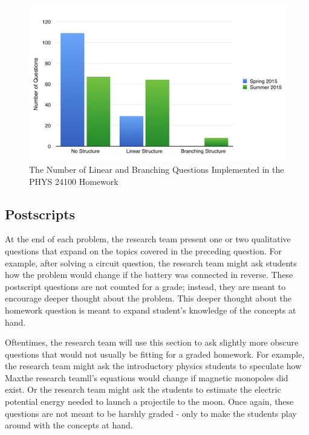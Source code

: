 \begin{figure}[!htb]
	\centering
	\includegraphics[width=6in]{img/chapter4/question_statistics}
	\caption[The Number of Linear and Branching Questions Implemented in the PHYS 24100 Homework]{The Number of Linear and Branching Questions Implemented in the PHYS 24100 Homework}
  \label{fig:questionStatistics}
\end{figure}


\subsection{Postscripts}

At the end of each problem, the research team present one or two qualitative questions that expand on the topics covered in the preceding question. For example, after solving a circuit question, the research team might ask students how the problem would change if the battery was connected in reverse. These postscript questions are not counted for a grade; instead, they are meant to encourage deeper thought about the problem. This deeper thought about the homework question is meant to expand student’s knowledge of the concepts at hand.

Oftentimes, the research team will use this section to ask slightly more obscure questions that would not usually be fitting for a graded homework. For example, the research team might ask the introductory physics students to speculate how Maxthe research teamll's equations would change if magnetic monopoles did exist. Or the research team might ask the students to estimate the electric potential energy needed to launch a projectile to the moon. Once again, these questions are not meant to be harshly graded - only to make the students play around with the concepts at hand.

